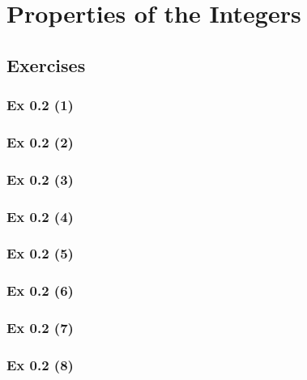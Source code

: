 \newpage		%

\section{Properties of the Integers}\label{sec:0.2}	
\subsection*{Exercises}\label{sec:0.2_Exercises}

\subsubsection{Ex 0.2 (1)}\label{sec:Ex_0.2.1}

\subsubsection{Ex 0.2 (2)}\label{sec:Ex_0.2.2}

\subsubsection{Ex 0.2 (3)}\label{sec:Ex_0.2.3}

\subsubsection{Ex 0.2 (4)}\label{sec:Ex_0.2.4}

\subsubsection{Ex 0.2 (5)}\label{sec:Ex_0.2.5}  

\subsubsection{Ex 0.2 (6)}\label{sec:Ex_0.2.6}

\subsubsection{Ex 0.2 (7)}\label{sec:Ex_0.2.7}

\subsubsection{Ex 0.2 (8)}\label{sec:Ex_0.2.8}

